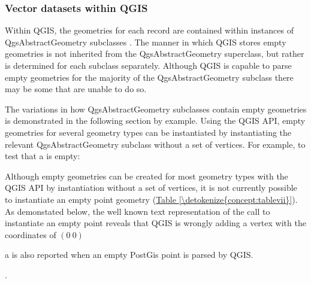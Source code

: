 \documentclass[letterpaper,10pt,english]{sphinxmanual}
\begin{document}
\subsubsection{Vector datasets within QGIS}
\label{\detokenize{concept:vector-datasets-within-qgis}}
Within QGIS, the geometries for each record are contained within instances of QgsAbstractGeometry subclasses .  The manner in which QGIS stores empty geometries is not inherited from the QgsAbstractGeometry superclass, but rather is determined for each subclass separately.  Although QGIS is capable to parse empty geometries for the majority of the QgsAbstractGeometry subclass there may be some that are unable to do so.

The variations in how QgsAbstractGeometry subclasses contain empty geometries is demonstrated in the following section by example.  Using the QGIS API, empty geometries for several geometry types can be instantiated by instantiating the relevant QgsAbstractGeometry subclass without a set of vertices.  For example, to test that a  is empty:

%
\begin{sphinxVerbatim}[commandchars=\\\{\}]
   
\end{sphinxVerbatim}

Although empty geometries can be created for most geometry types with the QGIS API by instantiation without a set of vertices, it is not currently possible to instantiate an empty point geometry (\hyperref[\detokenize{concept:tablevii}]{Table \ref{\detokenize{concept:tablevii}}}). As demonstated below, the well known text representation of the call to instantiate an empty point reveals that QGIS is wrongly adding a vertex with the coordinates of \((0\ 0)\)  %
\begin{footnote}[1]\sphinxAtStartFootnote
a  is also reported when an empty PostGis point is parsed by QGIS.
%
\end{footnote}.
\end{document}
